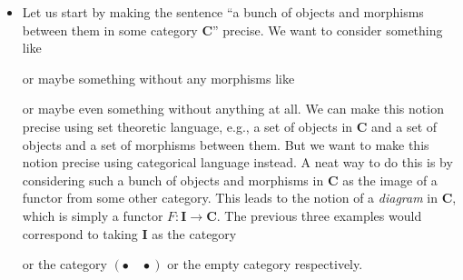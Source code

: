 \documentclass[12pt,reqno,a4paper]{amsart}
\theoremstyle{plain}
\theoremstyle{definition}
\theoremstyle{remark}
\begin{document}
\begin{itemize}
  \item Let us start by making the sentence ``a bunch of objects and morphisms between them in some category $\mathbf{C}$'' precise.
    We want to consider something like
    \begin{center}
    \end{center}
    or maybe something without any morphisms like
    \begin{center}
    \end{center}
    or maybe even something without anything at all.
    We can make this notion precise using set theoretic language, e.g., a set of objects in $\mathbf{C}$ and a set of objects and a set of morphisms between them.
    But we want to make this notion precise using categorical language instead.
    A neat way to do this is by considering such a bunch of objects and morphisms in $\mathbf{C}$ as the image of a functor from some other category.
    This leads to the notion of a \textit{diagram} in $\mathbf{C}$, which is simply a functor $F \colon \mathbf{I} \to \mathbf{C}$.
    The previous three examples would correspond to taking $\mathbf{I}$ as the category
    \begin{center}
    \end{center}
    or the category $(\bullet \quad \bullet)$ or the empty category respectively.


\end{itemize}
\end{document}
